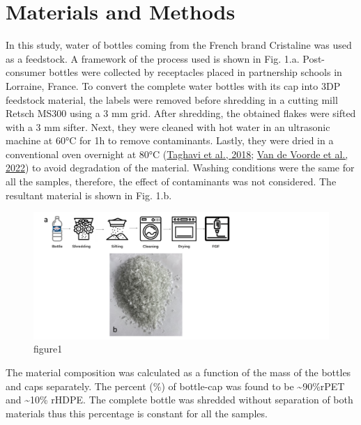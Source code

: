 \documentclass[
  12pt,
  number,
  review]{elsarticle}
\begin{document}
\hypertarget{materials-and-methods}{%
\section{Materials and Methods}\label{materials-and-methods}}

In this study, water of bottles coming from the French brand Cristaline
was used as a feedstock. A framework of the process used is shown in
Fig. 1.a. Post-consumer bottles were collected by receptacles placed in
partnership schools in Lorraine, France. To convert the complete water
bottles with its cap into 3DP feedstock material, the labels were
removed before shredding in a cutting mill Retsch MS300 using a 3 mm
grid. After shredding, the obtained flakes were sifted with a 3 mm
sifter. Next, they were cleaned with hot water in an ultrasonic machine
at 60°C for 1h to remove contaminants. Lastly, they were dried in a
conventional oven overnight at 80°C
(\protect\hyperlink{ref-taghavi2018}{Taghavi et al., 2018};
\protect\hyperlink{ref-vandevoorde2022}{Van de Voorde et al., 2022}) to
avoid degradation of the material. Washing conditions were the same for
all the samples, therefore, the effect of contaminants was not
considered. The resultant material is shown in Fig. 1.b.

\begin{figure}

{\centering \includegraphics{figures/Figure-1.png}

}

\caption{figure1}

\end{figure}

The material composition was calculated as a function of the mass of the
bottles and caps separately. The percent (\%) of bottle-cap was found to
be \textasciitilde90\%rPET and \textasciitilde10\% rHDPE. The complete
bottle was shredded without separation of both materials thus this
percentage is constant for all the samples.
\end{document}
